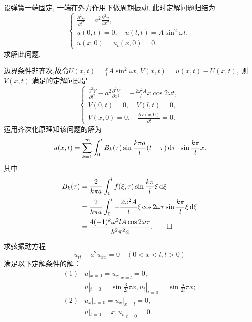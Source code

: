 \begin{exercise}
  设弹簧一端固定, 一端在外力作用下做周期振动, 此时定解问题归结为
  \[\begin{cases}
    \displaystyle\frac{\partial^2u}{\partial t^2} = a^2 \frac{\partial^2u}{\partial x^2}, \\
    u(0,t) = 0, \quad u(l,t) = A\sin^2\omega t, \\
    u(x,0) = u_t(x,0) = 0.
  \end{cases}\]
  求解此问题.
\end{exercise}

\begin{solve}
  边界条件非齐次,故令$\displaystyle U(x,t)=\frac{x}{l}A\sin^2\omega t$,
  $V(x,t)=u(x,t)-U(x,t)$, 则 $V(x,t)$ 满足的定解问题是
  \[\begin{cases}
    \displaystyle\frac{\partial^2V}{\partial t^2}-a^2\frac{\partial^2V}{\partial x^2}
      = -\frac{2\omega^2A}{l}x\cos 2\omega t, \\
    V(0,t)=0,\quad V(l,t)=0, \\
    \displaystyle V(x,0)=0,\quad \frac{\partial V(x,0)}{\partial t} = 0.
  \end{cases}\]
  运用齐次化原理知该问题的解为
  \[u(x,t)=\sum_{k=1}^{\infty}\int_0^tB_k(\tau)\sin\frac{k\pi a}{l}(t-\tau)\mathop{}\!\mathrm{d}\tau
    \cdot\sin\frac{k\pi}{l}x.\]
  其中
  \[\begin{split}
    B_k(\tau)
    & = \frac{2}{k\pi a}\int_0^lf(\xi,\tau)\sin\frac{k\pi}{l}\xi\mathop{}\!\mathrm{d}\xi \\
    & = \frac{2}{k\pi a}\int_0^l-\frac{2\omega^2A}{l}\xi\cos2\omega\tau
      \sin\frac{k\pi}{l}\xi\mathop{}\!\mathrm{d}\xi \\
    & = \frac{4(-1)^k\omega^2lA\cos2\omega\tau}{k^2\pi^2a}.\qedhere
  \end{split}\]
\end{solve}



\begin{exercise}
	求弦振动方程
	$$u_{tt}-a^2u_{xx}=0\quad(0<x<l,t>0)$$
	满足以下定解条件的解：
	$$\begin{aligned}
		(1)&u|_{x=0}=u_{x}|_{x=l}=0,\\
		&u|_{t=0}=\sin\frac{3}{2l}\pi x,u_{t}|_{t=0}=\sin\frac{5}{2l}\pi x;\\
		(2)&u_{x}|_{x=0}=u_{x}|_{x=l}=0,\\
		&u|_{t=0}=x,u_{t}|_{t=0}=0.
	\end{aligned}$$
\end{exercise}

